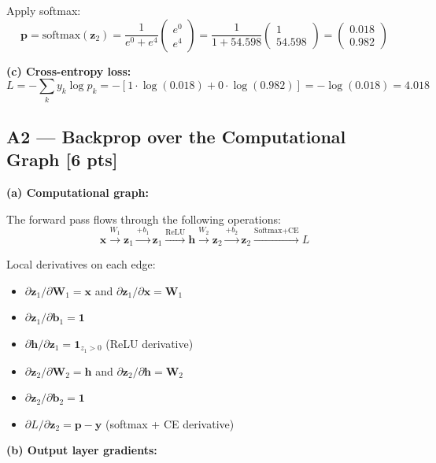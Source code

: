 \documentclass[11pt,a4paper]{article}
\begin{document}
Apply softmax:
\[
\mathbf{p} = \mathrm{softmax}(\mathbf{z}_2) = \frac{1}{e^0 + e^4}\begin{pmatrix}e^0\\[2pt] e^4\end{pmatrix}
= \frac{1}{1 + 54.598}\begin{pmatrix}1\\[2pt] 54.598\end{pmatrix}
= \begin{pmatrix}0.018\\[2pt] 0.982\end{pmatrix}
\]

\textbf{(c) Cross-entropy loss:}
\[
L = -\sum_k y_k\log p_k = -[1\cdot\log(0.018) + 0\cdot\log(0.982)] = -\log(0.018) = 4.018
\]

\subsection*{A2 --- Backprop over the Computational Graph \hfill [6 pts]}

\textbf{(a) Computational graph:}

The forward pass flows through the following operations:
\[
\mathbf{x} \xrightarrow{W_1} \mathbf{z}_1 \xrightarrow{+b_1} \mathbf{z}_1 \xrightarrow{\text{ReLU}} \mathbf{h}
\xrightarrow{W_2} \mathbf{z}_2 \xrightarrow{+b_2} \mathbf{z}_2 \xrightarrow{\text{Softmax+CE}} L
\]

Local derivatives on each edge:
\begin{itemize}
    \item $\partial \mathbf{z}_1 / \partial \mathbf{W}_1 = \mathbf{x}$ and $\partial \mathbf{z}_1 / \partial \mathbf{x} = \mathbf{W}_1$
    \item $\partial \mathbf{z}_1 / \partial \mathbf{b}_1 = \mathbf{1}$
    \item $\partial \mathbf{h} / \partial \mathbf{z}_1 = \mathbf{1}_{z_1 > 0}$ (ReLU derivative)
    \item $\partial \mathbf{z}_2 / \partial \mathbf{W}_2 = \mathbf{h}$ and $\partial \mathbf{z}_2 / \partial \mathbf{h} = \mathbf{W}_2$
    \item $\partial \mathbf{z}_2 / \partial \mathbf{b}_2 = \mathbf{1}$
    \item $\partial L / \partial \mathbf{z}_2 = \mathbf{p} - \mathbf{y}$ (softmax + CE derivative)
\end{itemize}

\textbf{(b) Output layer gradients:}
\end{document}
